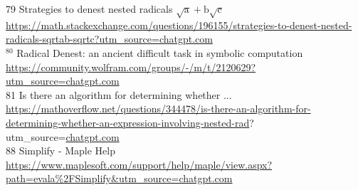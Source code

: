 \documentclass[10pt]{article}
\begin{document}
79 Strategies to denest nested radicals $\sqrt{\mathrm{a}}+\mathrm{b} \sqrt{\mathrm{c}}$\\
\href{https://math.stackexchange.com/questions/196155/strategies-to-denest-nested-radicals-sqrtab-sqrtc?utm_source=chatgpt.com}{https://math.stackexchange.com/questions/196155/strategies-to-denest-nested-radicals-sqrtab-sqrtc?utm\_source=chatgpt.com}\\
${ }^{80}$ Radical Denest: an ancient difficult task in symbolic computation\\
\href{https://community.wolfram.com/groups/-/m/t/2120629?utm_source=chatgpt.com}{https://community.wolfram.com/groups/-/m/t/2120629?utm\_source=chatgpt.com}\\
81 Is there an algorithm for determining whether ...\\
\href{https://mathoverflow.net/questions/344478/is-there-an-algorithm-for-determining-whether-an-expression-involving-nested-rad}{https://mathoverflow.net/questions/344478/is-there-an-algorithm-for-determining-whether-an-expression-involving-nested-rad}?\\
utm\_source=\href{http://chatgpt.com}{chatgpt.com}\\
88 Simplify - Maple Help\\
\href{https://www.maplesoft.com/support/help/maple/view.aspx?path=evala%2FSimplify&utm_source=chatgpt.com}{https://www.maplesoft.com/support/help/maple/view.aspx?path=evala\%2FSimplify\&utm\_source=chatgpt.com}
\end{document}

